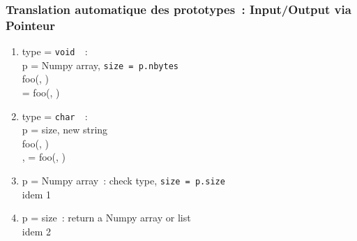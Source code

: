 \begin{frame}
  \frametitle{Translation automatique des prototypes~: Input/Output via Pointeur}
  \begin{enumerate}
  \item type = \texttt{void \ptr}~: \\
    p = Numpy array, \texttt{size = p.nbytes} \\
     foo(, ) \\
     = foo(, ) \\[.5em]
  \item type = \texttt{char \ptr}~: \\
    p = size, new string \\
     foo(, ) \\
    ,  = foo(, ) \\[.5em]
  \item p = Numpy array~: check type, \texttt{size = p.size} \\
    idem 1 \\[.5em]
  \item p = size~: return a Numpy array or list \\
    idem 2
  \end{enumerate}
\end{frame}

